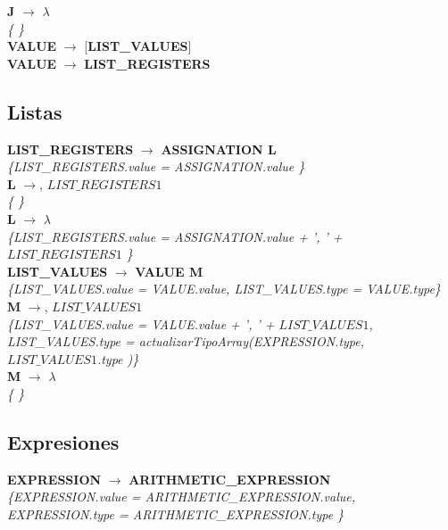 \documentclass[10pt,a4paper]{article}
\begin{document}
\textbf{J} $\rightarrow$ $\lambda$   \\
\textit{\{   \}} \\

\textbf{VALUE} $\rightarrow$ [\textbf{LIST\_VALUES}]   \\

\textbf{VALUE} $\rightarrow$ \textbf{LIST\_REGISTERS} \\

\subsection{Listas}
\textbf{LIST\_REGISTERS} $\rightarrow$ \textbf{ASSIGNATION L} \\
\textit{\{LIST\_REGISTERS.value =  ASSIGNATION.value \}} \\

\textbf{L} $\rightarrow$, \textbf{$LIST\_REGISTERS{1}$} \\
\textit{\{   \}} \\

\textbf{L} $\rightarrow$ $\lambda$\\
\textit{\{LIST\_REGISTERS.value =  ASSIGNATION.value + ', ' + $LIST\_REGISTERS{1}$ \}}  \\ 

\textbf{LIST\_VALUES} $\rightarrow$ \textbf{VALUE M} \\
\textit{\{LIST\_VALUES.value =  VALUE.value, LIST\_VALUES.type = VALUE.type\}} \\

\textbf{M} $\rightarrow$, \textbf{$LIST\_VALUES{1}$} \\
\textit{\{LIST\_VALUES.value =  VALUE.value + ', ' + $LIST\_VALUES{1}$, LIST\_VALUES.type = actualizarTipoArray(EXPRESSION.type, $LIST\_VALUES{1}$.type )\}} \\

\textbf{M} $\rightarrow$ $\lambda$ \\
\textit{\{   \}} \\

\subsection{Expresiones}
\textbf{EXPRESSION} $\rightarrow$ \textbf{ARITHMETIC\_EXPRESSION} \\   
\textit{\{EXPRESSION.value =  ARITHMETIC\_EXPRESSION.value, EXPRESSION.type = ARITHMETIC\_EXPRESSION.type \}}  \\
\end{document}
